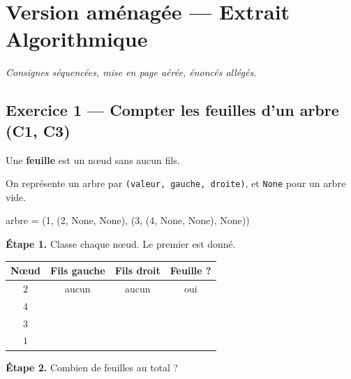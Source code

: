 \section*{Version aménagée --- Extrait Algorithmique}
\textit{Consignes séquencées, mise en page aérée, énoncés allégés.}

\bigskip

\subsection*{Exercice 1 --- Compter les feuilles d'un arbre (C1, C3)}

Une \textbf{feuille} est un nœud sans aucun fils.

\medskip
On représente un arbre par \texttt{(valeur, gauche, droite)}, et \texttt{None}
pour un arbre vide.

\begin{python}
arbre = (1,
         (2, None, None),
         (3, (4, None, None), None))
\end{python}

\bigskip

\textbf{Étape 1.} Classe chaque nœud. Le premier est donné.

\bigskip

\begin{center}
\begin{tabular}{|c|c|c|c|}
\hline
\textbf{Nœud} & \textbf{Fils gauche} & \textbf{Fils droit} & \textbf{Feuille ?} \\
\hline
$2$ & aucun & aucun & oui \\
\hline
$4$ & \dotfill & \dotfill & \dotfill \\
\hline
$3$ & \dotfill & \dotfill & \dotfill \\
\hline
$1$ & \dotfill & \dotfill & \dotfill \\
\hline
\end{tabular}
\end{center}

\bigskip

\textbf{Étape 2.} Combien de feuilles au total ?

